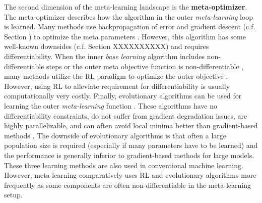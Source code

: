 The second dimension of the meta-learning landscape is the \textbf{meta-optimizer}.
The meta-optimizer describes how the algorithm in the outer \emph{meta-learning} loop is learned.
Many methods use backpropagation of error and gradient descent (c.f. Section ) to optimize the meta parameters \cite{ravi2016optimization, 10-5555-3305381-3305498, li2019feature, 10-5555-3305381-3305502, pmlr-v80-franceschi18a, Micaelli_Storkey_2021, pmlr-v108-lorraine20a}.
However, this algorithm has some well-known downsides (c.f. Section XXXXXXXXXX) and requires differentiability.
When the inner \emph{base learning} algorithm includes non-differentiable steps \cite{Cubuk_2019_CVPR} or the outer meta objective function is non-differentiable \cite{huang2019addressing}, many methods utilize the RL paradigm to optimize the outer objective \cite{Duan_Schulman_Chen_Bartlett_Sutskever_Abbeel_2016}.
However, using RL to alleviate requirement for differentiability is usually computationally very costly.
Finally, evolutionary algorithms can be used for learning the outer \emph{meta-learning} function \cite{schmidhuber-1987, Stanley_Clune_Lehman_Miikkulainen_2019, Salimans_Ho_Chen_Sidor_Sutskever_2017}.
These algorithms have no differentiability constraints, do not suffer from gradient degradation issues, are highly parallelizable, and can often avoid local minima better than gradient-based methods \cite{Salimans_Ho_Chen_Sidor_Sutskever_2017}.
The downside of evolutionary algorithms is that often a large population size is required (especially if many parameters have to be learned) and the performance is generally inferior to gradient-based methods for large models.
These three learning methods are also used in conventional machine learning.
However, meta-learning comparatively uses RL and evolutionary algorithms more frequently as some components are often non-differentiable in the meta-learning setup.

